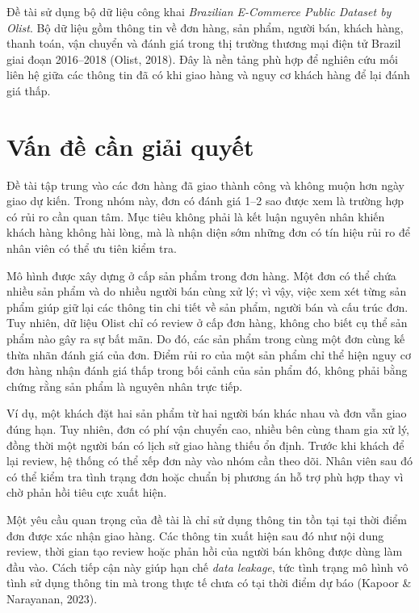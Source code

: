 \documentclass[12pt,a4paper]{report}
\begin{document}
Đề tài sử dụng bộ dữ liệu công khai \emph{Brazilian E-Commerce Public Dataset by Olist}. Bộ dữ liệu gồm thông tin về đơn hàng, sản phẩm, người bán, khách hàng, thanh toán, vận chuyển và đánh giá trong thị trường thương mại điện tử Brazil giai đoạn 2016--2018 (Olist, 2018). Đây là nền tảng phù hợp để nghiên cứu mối liên hệ giữa các thông tin đã có khi giao hàng và nguy cơ khách hàng để lại đánh giá thấp.

\section{Vấn đề cần giải quyết}
\label{sec:van-de}

Đề tài tập trung vào các đơn hàng đã giao thành công và không muộn hơn ngày giao dự kiến. Trong nhóm này, đơn có đánh giá 1--2 sao được xem là trường hợp có rủi ro cần quan tâm. Mục tiêu không phải là kết luận nguyên nhân khiến khách hàng không hài lòng, mà là nhận diện sớm những đơn có tín hiệu rủi ro để nhân viên có thể ưu tiên kiểm tra.

Mô hình được xây dựng ở cấp sản phẩm trong đơn hàng. Một đơn có thể chứa nhiều sản phẩm và do nhiều người bán cùng xử lý; vì vậy, việc xem xét từng sản phẩm giúp giữ lại các thông tin chi tiết về sản phẩm, người bán và cấu trúc đơn. Tuy nhiên, dữ liệu Olist chỉ có review ở cấp đơn hàng, không cho biết cụ thể sản phẩm nào gây ra sự bất mãn. Do đó, các sản phẩm trong cùng một đơn cùng kế thừa nhãn đánh giá của đơn. Điểm rủi ro của một sản phẩm chỉ thể hiện nguy cơ đơn hàng nhận đánh giá thấp trong bối cảnh của sản phẩm đó, không phải bằng chứng rằng sản phẩm là nguyên nhân trực tiếp.

Ví dụ, một khách đặt hai sản phẩm từ hai người bán khác nhau và đơn vẫn giao đúng hạn. Tuy nhiên, đơn có phí vận chuyển cao, nhiều bên cùng tham gia xử lý, đồng thời một người bán có lịch sử giao hàng thiếu ổn định. Trước khi khách để lại review, hệ thống có thể xếp đơn này vào nhóm cần theo dõi. Nhân viên sau đó có thể kiểm tra tình trạng đơn hoặc chuẩn bị phương án hỗ trợ phù hợp thay vì chờ phản hồi tiêu cực xuất hiện.

Một yêu cầu quan trọng của đề tài là chỉ sử dụng thông tin tồn tại tại thời điểm đơn được xác nhận giao hàng. Các thông tin xuất hiện sau đó như nội dung review, thời gian tạo review hoặc phản hồi của người bán không được dùng làm đầu vào. Cách tiếp cận này giúp hạn chế \emph{data leakage}, tức tình trạng mô hình vô tình sử dụng thông tin mà trong thực tế chưa có tại thời điểm dự báo (Kapoor \& Narayanan, 2023).
\end{document}
